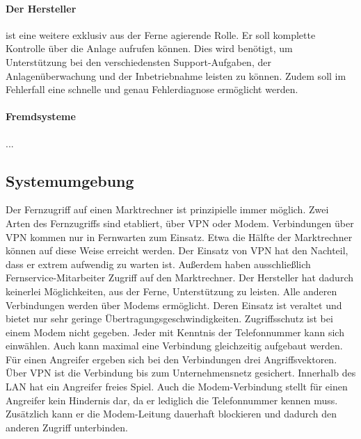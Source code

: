 \documentclass[11pt,a4paper]{report}
\begin{document}
\paragraph{Der Hersteller} ist eine weitere exklusiv aus der Ferne agierende Rolle. Er soll komplette Kontrolle über die Anlage aufrufen können. Dies wird benötigt, um Unterstützung bei den verschiedensten Support-Aufgaben, der Anlagenüberwachung und der Inbetriebnahme leisten zu können. Zudem soll im Fehlerfall eine schnelle und genau Fehlerdiagnose ermöglicht werden. 
\paragraph{Fremdsysteme} ...


\subsection{Systemumgebung}

Der Fernzugriff auf einen Marktrechner ist prinzipielle immer möglich. Zwei Arten des Fernzugriffs sind etabliert, über VPN oder Modem. Verbindungen über VPN kommen nur in Fernwarten zum Einsatz. Etwa die Hälfte der Marktrechner können auf diese Weise erreicht werden. Der Einsatz von VPN hat den Nachteil, dass er extrem aufwendig zu warten ist. Außerdem haben ausschließlich Fernservice-Mitarbeiter Zugriff auf den Marktrechner. Der Hersteller hat dadurch keinerlei Möglichkeiten, aus der Ferne, Unterstützung zu leisten. Alle anderen Verbindungen werden über Modems ermöglicht. Deren Einsatz ist veraltet und bietet nur sehr geringe Übertragungsgeschwindigkeiten. Zugriffsschutz ist bei einem Modem nicht gegeben. Jeder mit Kenntnis der Telefonnummer kann sich einwählen. Auch kann maximal eine Verbindung gleichzeitig aufgebaut werden. Für einen Angreifer ergeben sich bei den Verbindungen drei Angriffsvektoren. Über VPN ist die Verbindung bis zum Unternehmensnetz gesichert. Innerhalb des LAN hat ein Angreifer freies Spiel. Auch die Modem-Verbindung stellt für einen Angreifer kein Hindernis dar, da er lediglich die Telefonnummer kennen muss. Zusätzlich kann er die Modem-Leitung dauerhaft blockieren und dadurch den anderen Zugriff unterbinden.
\end{document}
